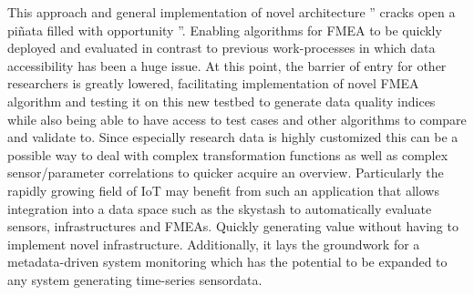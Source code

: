 This approach and general implementation of novel architecture '' cracks open a piñata filled with opportunity ''.\cite{zacharias_what_2023} Enabling algorithms for FMEA to be quickly deployed and evaluated in contrast to previous work-processes in which data accessibility has been a huge issue. At this point, the barrier of entry for other researchers is greatly lowered, facilitating implementation of novel FMEA algorithm and testing it on this new testbed to generate data quality indices while also being able to have access to test cases and other algorithms to compare and validate to. Since especially research data is highly customized this can be a possible way to deal with complex transformation functions as well as complex sensor/parameter correlations to quicker acquire an overview. Particularly the rapidly growing field of IoT may benefit from such an application that allows integration into a data space such as the skystash to automatically evaluate sensors, infrastructures and FMEAs. Quickly generating value without having to implement novel infrastructure.
Additionally, it lays the groundwork for a metadata-driven system monitoring which has the potential to be expanded to any system generating time-series sensordata.






